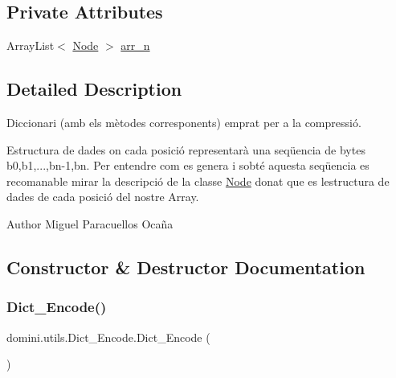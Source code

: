 \subsection*{Private Attributes}
\begin{DoxyCompactItemize}
\item 
Array\+List$<$ \hyperlink{classdomini_1_1utils_1_1Node}{Node} $>$ \hyperlink{classdomini_1_1utils_1_1Dict__Encode_abc506ae01222e16d9b6581efbdad1a97}{arr\+\_\+n}
\end{DoxyCompactItemize}


\subsection{Detailed Description}
Diccionari (amb els mètodes corresponents) emprat per a la compressió. 

Estructura de dades on cada posició representarà una seqüencia de bytes b0,b1,...,bn-\/1,bn. Per entendre com es genera i s\textquotesingle{}obté aquesta seqüencia es recomanable mirar la descripció de la classe \hyperlink{classdomini_1_1utils_1_1Node}{Node} donat que es l\textquotesingle{}estructura de dades de cada posició del nostre Array. \begin{DoxyAuthor}{Author}
Miguel Paracuellos Ocaña 
\end{DoxyAuthor}


\subsection{Constructor \& Destructor Documentation}
\mbox{\label{classdomini_1_1utils_1_1Dict__Encode_aa16372a031311494fdcae13d1a9b48c3}} 
\subsubsection{\texorpdfstring{Dict\+\_\+\+Encode()}{Dict\_Encode()}}
{\footnotesize\ttfamily domini.\+utils.\+Dict\+\_\+\+Encode.\+Dict\+\_\+\+Encode (\begin{DoxyParamCaption}{ }\end{DoxyParamCaption})\hspace{0.3cm}{\ttfamily [inline]}}



